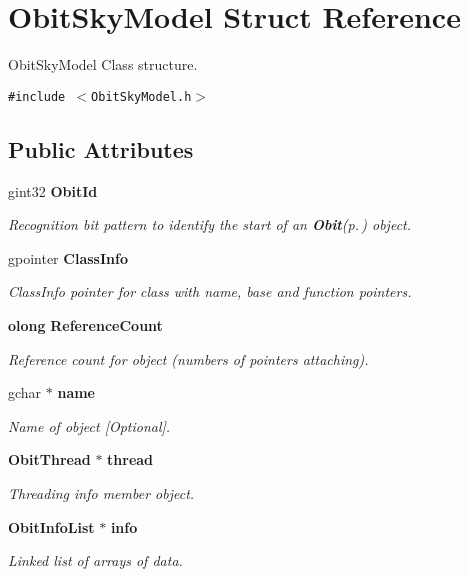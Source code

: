 \section{Obit\-Sky\-Model Struct Reference}
\label{structObitSkyModel}
Obit\-Sky\-Model Class structure.  


{\tt \#include $<$Obit\-Sky\-Model.h$>$}

\subsection*{Public Attributes}
\begin{CompactItemize}
\item 
gint32 {\bf Obit\-Id}
\begin{CompactList}\small\item\em Recognition bit pattern to identify the start of an {\bf Obit}{\rm (p.\,\pageref{structObit})} object. \item\end{CompactList}\item 
gpointer {\bf Class\-Info}
\begin{CompactList}\small\item\em Class\-Info pointer for class with name, base and function pointers. \item\end{CompactList}\item 
{\bf olong} {\bf Reference\-Count}
\begin{CompactList}\small\item\em Reference count for object (numbers of pointers attaching). \item\end{CompactList}\item 
gchar $\ast$ {\bf name}
\begin{CompactList}\small\item\em Name of object [Optional]. \item\end{CompactList}\item 
{\bf Obit\-Thread} $\ast$ {\bf thread}
\begin{CompactList}\small\item\em Threading info member object. \item\end{CompactList}\item 
{\bf Obit\-Info\-List} $\ast$ {\bf info}
\begin{CompactList}\small\item\em Linked list of arrays of data. \item\end{CompactList}\item 

\end{CompactItemize}
